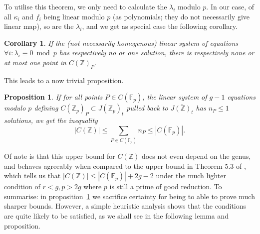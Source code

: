 \documentclass[12pt]{article}
\newcommand{\Z}{\mathbb{Z}}
\newcommand{\F}{\mathbb{F}}
\theoremstyle{plain}
\newtheorem{cor}[thm]{Corollary} %
\newtheorem{prop}[thm]{Proposition} %
\theoremstyle{definition}
\theoremstyle{remark}
\begin{document}
To utilise this theorem, we only need to calculate the $\lambda_i$ modulo $p$. In our case, of all $\kappa_i$ and $f_i$ being linear modulo $p$ (as polynomials; they do not necessarily give linear map), so are the $\lambda_i$, and we get as special case the following corollary.
\begin{cor}
\label{cor:finedixlinear}
If the (not necessarily homogenous) linear system of equations $\forall i: \lambda_i \equiv 0 \bmod p$ has respectively no or one solution, there is respectively none or at most one point in $C(\Z)_P$.
\end{cor}

This leads to a now trivial proposition.
\begin{prop}
\label{prop:linchabauty}
If for all points $P \in C(\F_p)$, the linear system of $g-1$ equations modulo $p$ defining $C(\Z_p)_P \subset J(\Z_p)_t$ pulled back to $\overline{J(\Z)_t}$ has $n_P \leq 1$ solutions, we get the inequality
\[
|C(\Z)| \leq \sum_{P \in C(\F_p)} n_P \leq |C(\F_p)|. 
\]
\end{prop}

Of note is that this upper bound for $C(\Z)$ does not even depend on the genus, and behaves agreeably when compared to the upper bound in Theorem 5.3 of \cite{poonen12}, which tells us that $|C(\Z)| \leq |C(\F_p)| + 2g-2$ under the much lighter condition of $r < g, p > 2g$ where $p$ is still a prime of good reduction. To summarise: in proposition~\ref{prop:linchabauty} we sacrifice certainty for being to able to prove much sharper bounds. However, a simple heuristic analysis shows that the conditions are quite likely to be satisfied, as we shall see in the following lemma and proposition.
\end{document}
